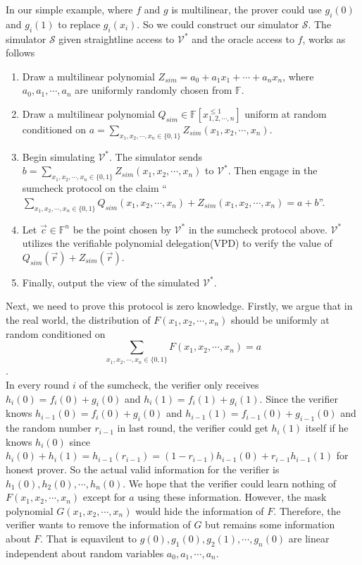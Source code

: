 \noindent
In our simple example, where $f$ and $g$ is multilinear, the prover could use $g_i(0)$ and $g_i(1)$ to replace $g_i(x_i)$. So we could construct our simulator $\mathcal{S}$. The simulator $\mathcal{S}$ given straightline access to $\mathcal{V^*}$ and the oracle access to $f$, works as follows

\begin{enumerate}

\item Draw a multilinear polynomial $Z_{sim} = a_0 + a_1x_1 + \cdots + a_nx_n$, where $a_0, a_1, \cdots, a_n$ are uniformly randomly chosen from $\mathbb{F}$. 

\item Draw a multilinear polynomial $Q_{sim} \in \mathbb{F}[x_{1, 2, \cdots, n}^{\leqslant 1}]$ uniform at random conditioned on $a = \sum\limits_{x_1, x_2, \cdots, x_n \in \{0, 1\}}Z_{sim}(x_1, x_2, \cdots, x_n)$.

\item Begin simulating $\mathcal{V}^*$. The simulator sends $b = \sum\limits_{x_1, x_2, \cdots, x_n \in \{0, 1\}}Z_{sim}(x_1, x_2, \cdots, x_n)$ to $\mathcal{V}^*$. Then engage in the sumcheck protocol on the claim ``$\sum\limits_{x_1, x_2, \cdots, x_n \in \{0, 1\}}Q_{sim}(x_1, x_2, \cdots, x_n) + Z_{sim}(x_1, x_2, \cdots, x_n) = a + b$''. 

\item Let $\vec{c} \in \mathbb{F}^n$ be the point chosen by $\mathcal{V}^*$ in the sumcheck protocol above. $\mathcal{V}^*$ utilizes the verifiable polynomial delegation(VPD) to verify the value of $Q_{sim}(\vec{r}) + Z_{sim}(\vec{r})$. 

\item Finally, output the view of the simulated $\mathcal{V}^*$. 

\end{enumerate} 

Next, we need to prove this protocol is zero knowledge. Firstly, we argue that in the real world, the distribution of $F(x_1, x_2, \cdots, x_n)$ should be uniformly at random conditioned on
$$\sum\limits_{x_1, x_2, \cdots, x_n \in \{0, 1\}}F(x_1, x_2, \cdots, x_n) = a$$.\\ 

\noindent
In every round $i$ of the sumcheck, the verifier only receives $h_i(0) = f_i(0) + g_i(0)$ and $h_i(1) = f_i(1) + g_i(1)$. Since the verifier knows $h_{i-1}(0) = f_i(0) + g_i(0)$ and $h_{i-1}(1) = f_{i-1}(0) + g_{i-1}(0)$ and the random number $r_{i-1}$ in last round, the verifier could get $h_{i}(1)$ itself if he knows $h_{i}(0)$ since $h_{i}(0) + h_{i}(1) = h_{i-1}(r_{i-1}) = (1 - r_{i-1})h_{i-1}(0) + r_{i-1}h_{i-1}(1)$ for honest prover. So the actual valid information for the verifier is $h_{1}(0), h_{2}(0), \cdots, h_{n}(0)$. We hope that the verifier could learn nothing of $F(x_1, x_2, \cdots, x_n)$ except for $a$ using these information. However, the mask polynomial $G(x_1, x_2, \cdots, x_n)$ would hide the information of $F$. Therefore, the verifier wants to remove the information of $G$ but remains some information about $F$. That is equavilent to $g(0), g_{1}(0), g_{2}(1), \cdots, g_{n}(0)$ are linear independent about random variables $a_0, a_1, \cdots, a_n$.

